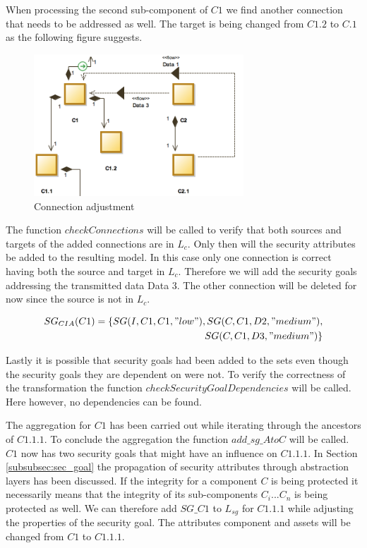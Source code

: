When processing the second sub-component of $C1$ we find another connection that needs to be addressed as well. The target is being changed from $C1.2$ to $C.1$ as the following figure suggests.

\begin{figure}[H]
\centering
\includegraphics[width=0.7\textwidth]{pictures/con_c12}
\caption{Connection adjustment}
\label{fig:con_c1.2}
\end{figure} 

The function $checkConnections$ will be called to verify that both sources and targets of the added connections are in $L_c$. Only then will the security attributes be added to the resulting model. In this case only one connection is correct having both the source and target in $L_c$. Therefore we will add the security goals addressing the transmitted data Data 3. The other connection will be deleted for now since the source is not in $L_c$.

\begin{align*}
SG_{CIA}(C1) = \{SG(I,C1,C1,"low"), SG(C,C1,D2, "medium"), \\ SG(C,C1,D3,"medium")\}
\end{align*}

Lastly it is possible that security goals had been added to the sets even though the security goals they are dependent on were not. To verify the correctness of the transformation the function $checkSecurityGoalDependencies$ will be called. Here however, no dependencies can be found.

The aggregation for $C1$ has been carried out while iterating through the ancestors of $C1.1.1$. To conclude the aggregation the function $add\_sg\_AtoC$ will be called. $C1$ now has two security goals that might have an influence on $C1.1.1$. In Section \ref{subsubsec:sec_goal} the propagation of security attributes through abstraction layers has been discussed. If the integrity for a component $C$ is being protected it necessarily means that the integrity of its sub-components $C_i ... C_n$ is being protected as well. We can therefore add $SG\_C1$ to $L_{sg}$ for $C1.1.1$ while adjusting the properties of the security goal. The attributes component and assets will be changed from $C1$ to $C1.1.1$.

